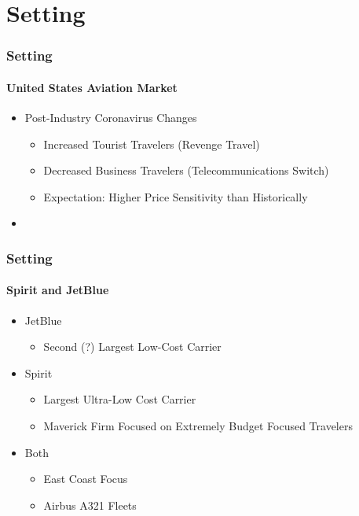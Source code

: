 \documentclass[xcolor=dvipsnames]{beamer}
\begin{document}
	\section{Setting}
	\begin{frame}
		\frametitle{Setting}
		\framesubtitle{United States Aviation Market}
		\begin{itemize}
			\item Post-Industry Coronavirus Changes
			\begin{itemize}
				\item Increased Tourist Travelers (Revenge Travel)
				\item Decreased Business Travelers (Telecommunications Switch)
				\item Expectation: Higher Price Sensitivity than Historically
			\end{itemize}
			\item 
		\end{itemize} 
	\end{frame}



	\begin{frame}
		\frametitle{Setting}
		\framesubtitle{Spirit and JetBlue}
			\begin{itemize}
			\item JetBlue 
			\begin{itemize}
				\item Second (?) Largest Low-Cost Carrier
			\end{itemize}
			\item Spirit 
			\begin{itemize}
				\item Largest Ultra-Low Cost Carrier
				\item Maverick Firm Focused on Extremely Budget Focused Travelers 
			\end{itemize}
			\item Both 
			\begin{itemize}
	 		\item East Coast Focus
	 		\item Airbus A321 Fleets
			\end{itemize}
		\end{itemize} 
	\end{frame}
\end{document}
